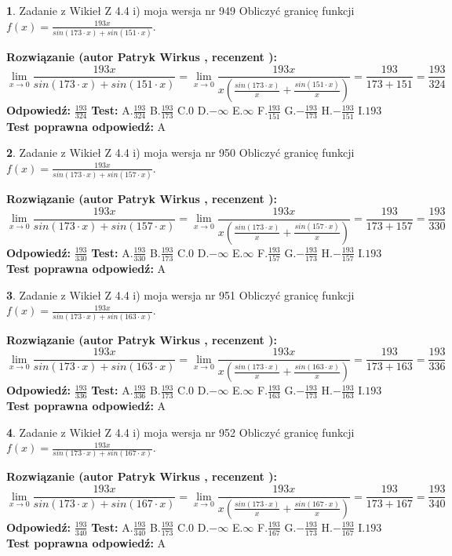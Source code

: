 \documentclass[12pt, a4paper]{article}
\theoremstyle{definition} %
\newtheorem{zad}{}
\newcommand{\zadStart}[1]{\begin{zad}#1\newline}
\newcommand{\zadStop}{\end{zad}}
\newcommand{\rozwStart}[2]{\noindent \textbf{Rozwiązanie (autor #1 , recenzent #2): }\newline}
\newcommand{\rozwStop}{\newline}
\newcommand{\odpStart}{\noindent \textbf{Odpowiedź:}\newline}
\newcommand{\odpStop}{\newline}
\newcommand{\testStart}{\noindent \textbf{Test:}\newline}
\newcommand{\testStop}{\newline}
\newcommand{\kluczStart}{\noindent \textbf{Test poprawna odpowiedź:}\newline}
\newcommand{\kluczStop}{\newline}
\begin{document}
\zadStart{Zadanie z Wikieł Z 4.4 i) moja wersja nr 949}
Obliczyć granicę funkcji $f(x)=\frac{193x}{sin(173\cdot x) +sin(151\cdot x)}$.
\zadStop
\rozwStart{Patryk Wirkus}{}
$$\lim\limits_{x\to 0}\frac{193x}{sin(173\cdot x) +sin(151\cdot x)}=\lim\limits_{x\to 0}\frac{193x}{x(\frac{sin(173\cdot x)}{x}+\frac{sin(151\cdot x)}{x})}=\frac{193}{173+151} = \frac{193}{324}$$
\rozwStop
\odpStart
$\frac{193}{324}$
\odpStop
\testStart
A.$\frac{193}{324}$
B.$\frac{193}{173}$
C.$0$
D.$-\infty$
E.$\infty$
F.$\frac{193}{151}$
G.$-\frac{193}{173}$
H.$-\frac{193}{151}$
I.$193$
\testStop
\kluczStart
A
\kluczStop



\zadStart{Zadanie z Wikieł Z 4.4 i) moja wersja nr 950}
Obliczyć granicę funkcji $f(x)=\frac{193x}{sin(173\cdot x) +sin(157\cdot x)}$.
\zadStop
\rozwStart{Patryk Wirkus}{}
$$\lim\limits_{x\to 0}\frac{193x}{sin(173\cdot x) +sin(157\cdot x)}=\lim\limits_{x\to 0}\frac{193x}{x(\frac{sin(173\cdot x)}{x}+\frac{sin(157\cdot x)}{x})}=\frac{193}{173+157} = \frac{193}{330}$$
\rozwStop
\odpStart
$\frac{193}{330}$
\odpStop
\testStart
A.$\frac{193}{330}$
B.$\frac{193}{173}$
C.$0$
D.$-\infty$
E.$\infty$
F.$\frac{193}{157}$
G.$-\frac{193}{173}$
H.$-\frac{193}{157}$
I.$193$
\testStop
\kluczStart
A
\kluczStop



\zadStart{Zadanie z Wikieł Z 4.4 i) moja wersja nr 951}
Obliczyć granicę funkcji $f(x)=\frac{193x}{sin(173\cdot x) +sin(163\cdot x)}$.
\zadStop
\rozwStart{Patryk Wirkus}{}
$$\lim\limits_{x\to 0}\frac{193x}{sin(173\cdot x) +sin(163\cdot x)}=\lim\limits_{x\to 0}\frac{193x}{x(\frac{sin(173\cdot x)}{x}+\frac{sin(163\cdot x)}{x})}=\frac{193}{173+163} = \frac{193}{336}$$
\rozwStop
\odpStart
$\frac{193}{336}$
\odpStop
\testStart
A.$\frac{193}{336}$
B.$\frac{193}{173}$
C.$0$
D.$-\infty$
E.$\infty$
F.$\frac{193}{163}$
G.$-\frac{193}{173}$
H.$-\frac{193}{163}$
I.$193$
\testStop
\kluczStart
A
\kluczStop



\zadStart{Zadanie z Wikieł Z 4.4 i) moja wersja nr 952}
Obliczyć granicę funkcji $f(x)=\frac{193x}{sin(173\cdot x) +sin(167\cdot x)}$.
\zadStop
\rozwStart{Patryk Wirkus}{}
$$\lim\limits_{x\to 0}\frac{193x}{sin(173\cdot x) +sin(167\cdot x)}=\lim\limits_{x\to 0}\frac{193x}{x(\frac{sin(173\cdot x)}{x}+\frac{sin(167\cdot x)}{x})}=\frac{193}{173+167} = \frac{193}{340}$$
\rozwStop
\odpStart
$\frac{193}{340}$
\odpStop
\testStart
A.$\frac{193}{340}$
B.$\frac{193}{173}$
C.$0$
D.$-\infty$
E.$\infty$
F.$\frac{193}{167}$
G.$-\frac{193}{173}$
H.$-\frac{193}{167}$
I.$193$
\testStop
\kluczStart
A
\kluczStop
\end{document}
